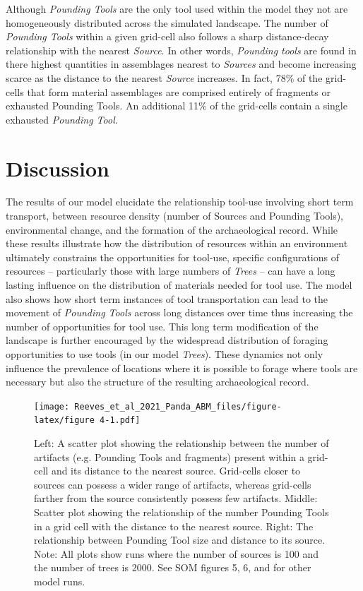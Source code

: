 \documentclass[9pt,twocolumn,twoside,]{pnas-new}
\begin{document}
Although \emph{Pounding Tools} are the only tool used within the model
they not are homogeneously distributed across the simulated landscape.
The number of \emph{Pounding Tools} within a given grid-cell also
follows a sharp distance-decay relationship with the nearest
\emph{Source}. In other words, \emph{Pounding tools} are found in there
highest quantities in assemblages nearest to \emph{Sources} and become
increasing scarce as the distance to the nearest \emph{Source}
increases. In fact, 78\% of the grid-cells that form material
assemblages are comprised entirely of fragments or exhausted Pounding
Tools. An additional 11\% of the grid-cells contain a single exhausted
\emph{Pounding Tool}.

\hypertarget{discussion}{%
\section{Discussion}\label{discussion}}

The results of our model elucidate the relationship tool-use involving
short term transport, between resource density (number of Sources and
Pounding Tools), environmental change, and the formation of the
archaeological record. While these results illustrate how the
distribution of resources within an environment ultimately constrains
the opportunities for tool-use, specific configurations of resources --
particularly those with large numbers of \emph{Trees} -- can have a long
lasting influence on the distribution of materials needed for tool use.
The model also shows how short term instances of tool transportation can
lead to the movement of \emph{Pounding Tools} across long distances over
time thus increasing the number of opportunities for tool use. This long
term modification of the landscape is further encouraged by the
widespread distribution of foraging opportunities to use tools (in our
model \emph{Trees}). These dynamics not only influence the prevalence of
locations where it is possible to forage where tools are necessary but
also the structure of the resulting archaeological record.

\begin{figure}

\texttt{[image: Reeves\_et\_al\_2021\_Panda\_ABM\_files/figure-latex/figure 4-1.pdf]}

\caption{Left: A scatter plot showing the relationship between the number of artifacts (e.g. Pounding Tools and fragments) present within a grid-cell and its distance to the nearest source. Grid-cells closer to sources can possess a wider range of artifacts, whereas grid-cells farther from the source consistently possess few artifacts. Middle: Scatter plot showing the relationship of the number Pounding Tools in a grid cell with the distance to the nearest source. Right: The relationship between Pounding Tool size and distance to its source. Note: All plots show runs where the number of sources is 100 and the number of trees is 2000. See SOM figures 5, 6, and for other model runs.}

\label{assemblages}

\end{figure}
\end{document}
